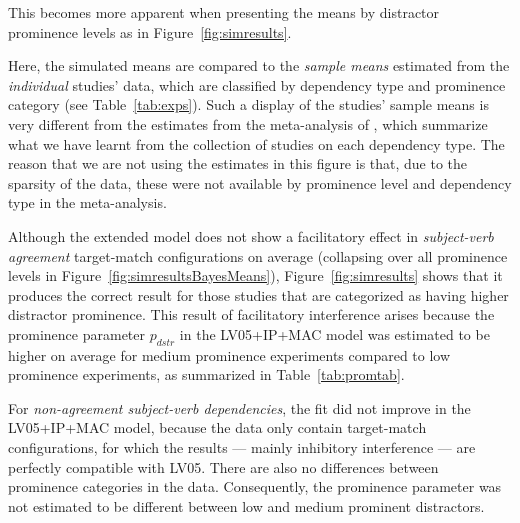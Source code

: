 \documentclass{cambridge7A}\usepackage[]{graphicx}\usepackage[]{color}
\newcommand{\revisedII}[1]{#1}
\newcommand{\revFE}[1]{#1}
\begin{document}
\revFE{
This becomes more apparent when presenting the means by distractor prominence levels as in Figure~\ref{fig:simresults}.
}
Here, the simulated means are compared to the \textit{sample means} estimated from the \textit{individual} studies' data, which are classified by dependency type and prominence category (see Table~\ref{tab:exps}). Such a display of the studies' sample means is very different from the estimates from the meta-analysis of \cite{JaegerEngelmannVasishth2017}, which summarize what we have learnt from the collection of studies on each dependency type.
The reason that we are not using the estimates in this figure is that, due to the sparsity of the data, these were not available by prominence level and dependency type in the meta-analysis.

Although the extended model does not show a facilitatory effect in \emph{subject-verb agreement} target-match configurations on average (collapsing over all prominence levels in Figure~\ref{fig:simresultsBayesMeans}), Figure~\ref{fig:simresults} shows that it produces the correct result for those studies that are categorized as having higher distractor prominence.
This result of facilitatory interference arises because the prominence parameter $p_{dstr}$ in the LV05+IP+MAC model was estimated to be higher on average for medium prominence experiments compared to low prominence experiments, as summarized in Table~\ref{tab:promtab}. 

For \emph{non-agreement subject-verb dependencies}, the fit did not improve in the LV05+IP+MAC model, because the data only contain target-match configurations, for which the results --- mainly inhibitory interference --- are perfectly compatible with LV05. There are also no differences between prominence categories in the data. Consequently, the prominence parameter was not estimated to be different between low and medium prominent distractors.
\end{document}
